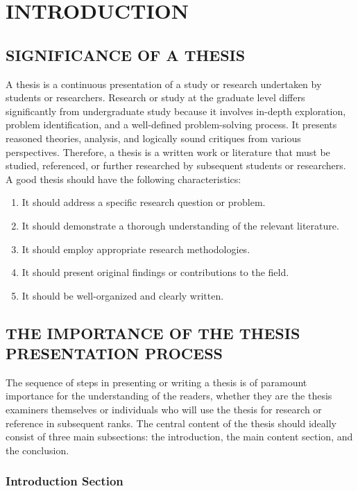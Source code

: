 \chapter{INTRODUCTION}

\section{SIGNIFICANCE OF A THESIS}

A thesis is a continuous presentation of a study or research undertaken by
students or researchers. Research or study at the graduate level differs significantly
from undergraduate study because it involves in-depth exploration, problem
identification, and a well-defined problem-solving process. It presents reasoned
theories, analysis, and logically sound critiques from various perspectives. Therefore, a
thesis is a written work or literature that must be studied, referenced, or further
researched by subsequent students or researchers. A good thesis should have the following characteristics:
\begin{enumerate}[label=\arabic*)]
    \item It should address a specific research question or problem.
    \item It should demonstrate a thorough understanding of the relevant literature.
    \item It should employ appropriate research methodologies.
    \item It should present original findings or contributions to the field.
    \item It should be well-organized and clearly written.
\end{enumerate}

\section{THE IMPORTANCE OF THE THESIS PRESENTATION PROCESS}

The sequence of steps in presenting or writing a thesis is of paramount
importance for the understanding of the readers, whether they are the thesis
examiners themselves or individuals who will use the thesis for research or reference
in subsequent ranks. The central content of the thesis should ideally consist of three
main subsections: the introduction, the main content section, and the conclusion.

\subsection{Introduction Section}

